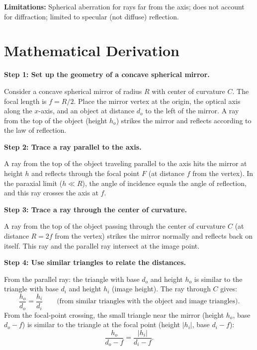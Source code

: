 \textbf{Limitations:} Spherical aberration for rays far from the axis; does not account for diffraction; limited to specular (not diffuse) reflection.


\section*{Mathematical Derivation}

\textbf{Step 1: Set up the geometry of a concave spherical mirror.}

Consider a concave spherical mirror of radius $R$ with center of curvature $C$. The focal length is $f = R/2$. Place the mirror vertex at the origin, the optical axis along the $x$-axis, and an object at distance $d_o$ to the left of the mirror. A ray from the top of the object (height $h_o$) strikes the mirror and reflects according to the law of reflection.

\textbf{Step 2: Trace a ray parallel to the axis.}

A ray from the top of the object traveling parallel to the axis hits the mirror at height $h$ and reflects through the focal point $F$ (at distance $f$ from the vertex). In the paraxial limit ($h \ll R$), the angle of incidence equals the angle of reflection, and this ray crosses the axis at $f$.

\textbf{Step 3: Trace a ray through the center of curvature.}

A ray from the top of the object passing through the center of curvature $C$ (at distance $R = 2f$ from the vertex) strikes the mirror normally and reflects back on itself. This ray and the parallel ray intersect at the image point.

\textbf{Step 4: Use similar triangles to relate the distances.}

From the parallel ray: the triangle with base $d_o$ and height $h_o$ is similar to the triangle with base $d_i$ and height $h_i$ (image height). The ray through $C$ gives:
\begin{equation}
\frac{h_o}{d_o} = \frac{h_i}{d_i} \qquad\text{(from similar triangles with the object and image triangles)}.
\end{equation}
From the focal-point crossing, the small triangle near the mirror (height $h_o$, base $d_o - f$) is similar to the triangle at the focal point (height $|h_i|$, base $d_i - f$):
\begin{equation}
\frac{h_o}{d_o - f} = \frac{|h_i|}{d_i - f}.
\end{equation}

